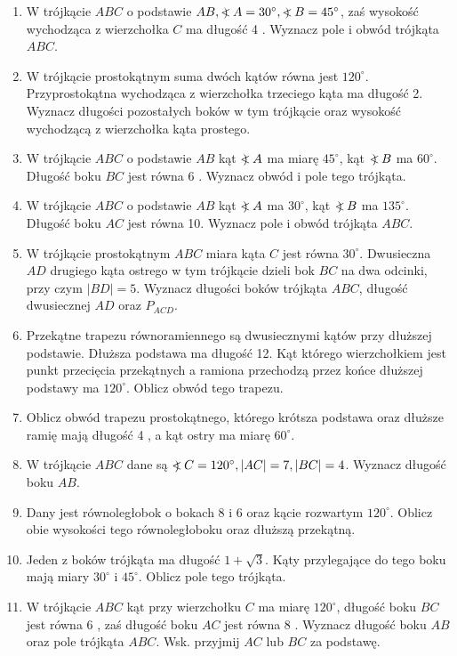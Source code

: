 \documentclass[10pt]{article}
\newcommand\Varangle{\mathop{{<\!\!\!\!\!\text{\small)}}\:}\nolimits}
\begin{document}
\begin{enumerate}
  \item W trójkącie \(A B C\) o podstawie \(A B, \Varangle A=30^{\circ}, \Varangle B=45^{\circ}\), zaś wysokość wychodząca z wierzchołka \(C\) ma długość 4 . Wyznacz pole i obwód trójkąta \(A B C\).
  \item W trójkącie prostokątnym suma dwóch kątów równa jest \(120^{\circ}\). Przyprostokątna wychodząca z wierzchołka trzeciego kąta ma długość 2. Wyznacz długości pozostałych boków w tym trójkącie oraz wysokość wychodzącą z wierzchołka kąta prostego.
  \item W trójkącie \(A B C\) o podstawie \(A B\) kąt \(\Varangle A\) ma miarę \(45^{\circ}\), kąt \(\Varangle B\) ma \(60^{\circ}\). Długość boku \(B C\) jest równa 6 . Wyznacz obwód i pole tego trójkąta.
  \item W trójkącie \(A B C\) o podstawie \(A B\) kąt \(\Varangle A\) ma \(30^{\circ}\), kąt \(\Varangle B\) ma \(135^{\circ}\). Długość boku \(A C\) jest równa 10. Wyznacz pole i obwód trójkąta \(A B C\).
  \item W trójkącie prostokątnym \(A B C\) miara kąta \(C\) jest równa \(30^{\circ}\). Dwusieczna \(A D\) drugiego kąta ostrego w tym trójkącie dzieli bok \(B C\) na dwa odcinki, przy czym \(|B D|=5\). Wyznacz długości boków trójkąta \(A B C\), długość dwusiecznej \(A D\) oraz \(P_{A C D}\).
  \item Przekątne trapezu równoramiennego są dwusiecznymi kątów przy dłuższej podstawie. Dłuższa podstawa ma długość 12. Kąt którego wierzchołkiem jest punkt przecięcia przekątnych a ramiona przechodzą przez końce dłuższej podstawy ma \(120^{\circ}\). Oblicz obwód tego trapezu.
  \item Oblicz obwód trapezu prostokątnego, którego krótsza podstawa oraz dłuższe ramię mają długość 4 , a kąt ostry ma miarę \(60^{\circ}\).
  \item W trójkącie \(A B C\) dane są \(\Varangle C=120^{\circ},|A C|=7,|B C|=4\). Wyznacz długość boku \(A B\).
  \item Dany jest równoległobok o bokach 8 i 6 oraz kącie rozwartym \(120^{\circ}\). Oblicz obie wysokości tego równoległoboku oraz dłuższą przekątną.
  \item Jeden z boków trójkąta ma długość \(1+\sqrt{3}\). Kąty przylegające do tego boku mają miary \(30^{\circ}\) i \(45^{\circ}\). Oblicz pole tego trójkąta.
  \item W trójkącie \(A B C\) kąt przy wierzchołku \(C\) ma miarę \(120^{\circ}\), długość boku \(B C\) jest równa 6 , zaś długość boku \(A C\) jest równa 8 . Wyznacz długość boku \(A B\) oraz pole trójkąta \(A B C\). Wsk. przyjmij \(A C\) lub \(B C\) za podstawę.
\end{enumerate}
\end{document}
